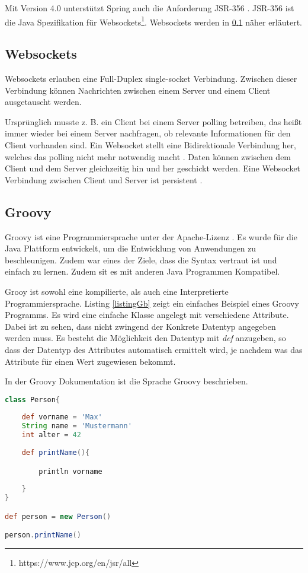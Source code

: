 Mit Version 4.0 unterstützt Spring auch die Anforderung JSR-356 \cite[Seite 14]{iuliana2017}. JSR-356 ist die Java Spezifikation für Websockets\footnote{https://www.jcp.org/en/jsr/all}. Websockets werden in \ref{websocket} näher erläutert.


\subsection{Websockets}\label{websocket}

Websockets erlauben eine Full-Duplex single-socket Verbindung. Zwischen dieser Verbindung können Nachrichten zwischen einem Server und einem Client ausgetauscht werden. 

Ursprünglich musste z. B. ein Client bei einem Server polling betreiben, das heißt immer wieder bei einem Server nachfragen, ob relevante Informationen für den Client vorhanden sind. Ein Websocket stellt eine Bidirektionale Verbindung her, welches das polling nicht mehr notwendig macht \cite[Seite 751f]{iuliana2017}. Daten können zwischen dem Client und dem Server gleichzeitig hin und her geschickt werden. Eine Websocket Verbindung zwischen Client und Server ist persistent \cite{malte2017}. 

\subsection{Groovy}

Groovy ist eine Programmiersprache unter der Apache-Lizenz \cite{groovy2017}.
Es wurde für die Java Plattform entwickelt, um die Entwicklung von Anwendungen zu beschleunigen. Zudem war eines der Ziele, dass die Syntax vertraut ist und einfach zu lernen. Zudem sit es mit anderen Java Programmen Kompatibel. 

Grooy ist sowohl eine kompilierte, als auch eine Interpretierte Programmiersprache. 
Listing \ref{listingGb} zeigt ein einfaches Beispiel eines Groovy Programms. Es wird eine einfache Klasse angelegt mit verschiedene Attribute. Dabei ist zu sehen, dass nicht zwingend der Konkrete Datentyp angegeben werden muss. Es besteht die Möglichkeit den Datentyp mit \textit{def} anzugeben, so dass der Datentyp des Attributes automatisch ermittelt wird, je nachdem was das Attribute für einen Wert zugewiesen bekommt. 

In der Groovy Dokumentation \cite{groovylang2017} ist die Sprache Groovy beschrieben.

\begin{lstlisting}[language=Groovy,caption={Eine einfache Groovy Klasse}, label=listingGb]
class Person{ 
	
	def vorname = 'Max'
	String name = 'Mustermann'
	int alter = 42
	
	def printName(){

		println vorname
		
	}
}

def person = new Person()

person.printName()
\end{lstlisting}

